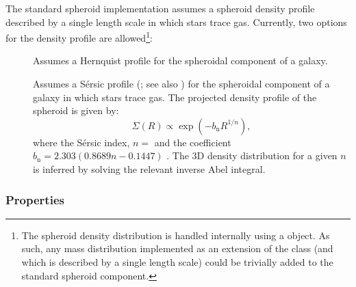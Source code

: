 The standard spheroid implementation assumes a spheroid density profile described by a single length scale in which stars trace gas. Currently, two options for the density profile are allowed\footnote{The spheroid density distribution is handled internally using a  object. As such, any mass distribution implemented as an extension of the  class (and which is described by a single length scale) could be trivially added to the standard spheroid component.}:
\begin{description}
\item [] Assumes a Hernquist profile \citep{hernquist_analytical_1990} for the spheroidal \gls{component} of a galaxy.
\item [] Assumes a S\'ersic profile (\citealt{sersic_influence_1963}; see also \citealt{mazure_exact_2002}) for the spheroidal \gls{component} of a galaxy in which stars trace gas. The projected density profile of the spheroid is given by:
\begin{equation}
 \Sigma(R) \propto \exp\left(-b_\mathrm{n} R^{1/n} \right),
\end{equation}
where the S\'ersic index, $n=$\mono{[spheroidSersicIndex]} and the coefficient $b_\mathrm{n}=2.303(0.8689 n-0.1447)$ \cite{wadadekar_two-dimensional_1999}. The 3D density distribution for a given $n$ is inferred by solving the relevant inverse Abel integral.
\end{description}

\subsubsection{Properties}

